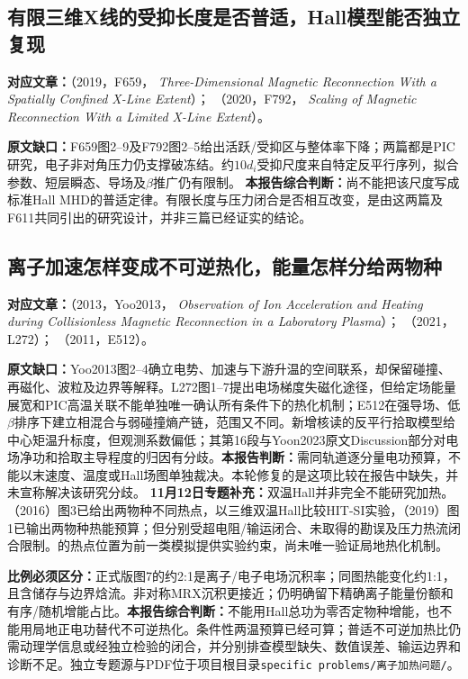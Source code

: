 \documentclass[UTF8,a4paper,11pt,openany,fontset=fandol]{ctexbook}
\begin{document}
\subsection{有限三维X线的受抑长度是否普适，Hall模型能否独立复现}
\textbf{对应文章：}\citet{F659}（2019，F659，
\emph{Three-Dimensional Magnetic Reconnection With a Spatially Confined X-Line Extent}）；
\citet{F792}（2020，F792，
\emph{Scaling of Magnetic Reconnection With a Limited X-Line Extent}）。

\textbf{原文缺口：}F659图2--9及F792图2--5给出活跃/受抑区与整体率下降；两篇都是PIC研究，电子非对角压力仍支撑破冻结。约$10d_i$受抑尺度来自特定反平行序列，拟合参数、短层瞬态、导场及$\beta$推广仍有限制。
\textbf{本报告综合判断：}尚不能把该尺度写成标准Hall MHD的普适定律。有限长度与压力闭合是否相互改变，是由这两篇及F611共同引出的研究设计，并非三篇已经证实的结论。\citep{F611}

\subsection{离子加速怎样变成不可逆热化，能量怎样分给两物种}
\textbf{对应文章：}\citet{Yoo2013}（2013，Yoo2013，
\emph{Observation of Ion Acceleration and Heating during Collisionless Magnetic Reconnection in a Laboratory Plasma}）；
\citet{L272}（2021，L272）；
\citet{E512}（2011，E512）。

\textbf{原文缺口：}Yoo2013图2--4确立电势、加速与下游升温的空间联系，却保留碰撞、再磁化、波粒及边界等解释。L272图1--7提出电场梯度失磁化途径，但给定场能量展宽和PIC高温关联不能单独唯一确认所有条件下的热化机制；E512在强导场、低$\beta$排序下建立相混合与弱碰撞熵产链，范围又不同。新增核读的\citet{Drake2009Pickup}反平行拾取模型给中心矩温升标度，但观测系数偏低；其第16段与Yoon2023原文Discussion部分对电场净功和拾取主导程度的归因有分歧。\textbf{本报告判断：}需同轨道逐分量电功预算，不能以末速度、温度或Hall场图单独裁决。本轮修复的是这项比较在报告中缺失，并未宣称解决该研究分歧。
\textbf{11月12日专题补充：}双温Hall并非完全不能研究加热。\citet{L223}（2016）图3已给出两物种不同热点，\citet{Kaptanoglu2020}以三维双温Hall比较HIT-SI实验，\citet{TenBarge2019MMS}（2019）图1已输出两物种热能预算；但分别受超电阻/输运闭合、未取得的勘误及压力热流闭合限制。\citet{Tanabe2015MAST}的热点位置为前一类模拟提供实验约束，尚未唯一验证局地热化机制。

\textbf{比例必须区分：}\citet{F674}正式版图7的约2:1是离子/电子电场沉积率；同图热能变化约1:1，且含储存与边界焓流。\citet{Yoo2017Heating}非对称MRX沉积更接近；\citet{Yoon2023PhaseSpace}仍明确留下精确离子能量份额和有序/随机增能占比。\textbf{本报告综合判断：}不能用Hall总功为零否定物种增能，也不能用局地正电功替代不可逆热化。条件性两温预算已经可算；普适不可逆加热比仍需动理学信息或经独立检验的闭合，并分别排查模型缺失、数值误差、输运边界和诊断不足。独立专题源与PDF位于项目根目录\texttt{specific problems/离子加热问题/}。
\end{document}

